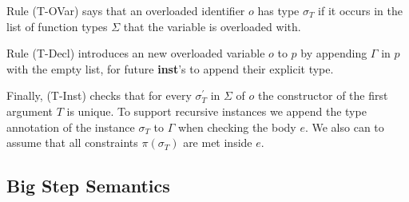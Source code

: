 \documentclass[runningheads]{llncs}
\begin{document}
Rule (T-OVar) says that an overloaded identifier $o$ has type $\sigma_T$ if it occurs in the list of function types $\Sigma$ that the variable is overloaded with. 

Rule (T-Decl) introduces an new overloaded variable $o$ to $p$ by appending $\Gamma$ in $p$ with the empty list, for future \textbf{inst}'s to append their explicit type.

Finally, (T-Inst) checks that for every $\sigma_T^\prime$ in $\Sigma$ of $o$ the constructor of the first argument $T$ is unique. To support recursive instances we append the type annotation of the instance $\sigma_T$ to $\Gamma$ when checking the body $e$. We also can to assume that all constraints $\pi(\sigma_T)$ are met inside $e$. 
\subsection{Big Step Semantics}
\end{document}
